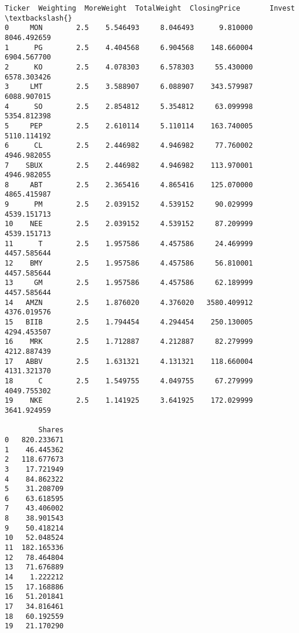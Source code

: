 \documentclass[11pt]{article}
\makeatletter
\newcommand{\boxspacing}{\kern\kvtcb@left@rule\kern\kvtcb@boxsep}
\newcommand{\prompt}[4]{
        {\ttfamily\llap{{\color{#2}[#3]:\hspace{3pt}#4}}\vspace{-\baselineskip}}
    }
\makeatother
\begin{document}
            \begin{tcolorbox}[breakable, size=fbox, boxrule=.5pt, pad at break*=1mm, opacityfill=0]
\prompt{Out}{outcolor}{50}{\boxspacing}
\begin{Verbatim}[commandchars=\\\{\}]
   Ticker  Weighting  MoreWeight  TotalWeight  ClosingPrice       Invest  \textbackslash{}
0     MON        2.5    5.546493     8.046493      9.810000  8046.492659
1      PG        2.5    4.404568     6.904568    148.660004  6904.567700
2      KO        2.5    4.078303     6.578303     55.430000  6578.303426
3     LMT        2.5    3.588907     6.088907    343.579987  6088.907015
4      SO        2.5    2.854812     5.354812     63.099998  5354.812398
5     PEP        2.5    2.610114     5.110114    163.740005  5110.114192
6      CL        2.5    2.446982     4.946982     77.760002  4946.982055
7    SBUX        2.5    2.446982     4.946982    113.970001  4946.982055
8     ABT        2.5    2.365416     4.865416    125.070000  4865.415987
9      PM        2.5    2.039152     4.539152     90.029999  4539.151713
10    NEE        2.5    2.039152     4.539152     87.209999  4539.151713
11      T        2.5    1.957586     4.457586     24.469999  4457.585644
12    BMY        2.5    1.957586     4.457586     56.810001  4457.585644
13     GM        2.5    1.957586     4.457586     62.189999  4457.585644
14   AMZN        2.5    1.876020     4.376020   3580.409912  4376.019576
15   BIIB        2.5    1.794454     4.294454    250.130005  4294.453507
16    MRK        2.5    1.712887     4.212887     82.279999  4212.887439
17   ABBV        2.5    1.631321     4.131321    118.660004  4131.321370
18      C        2.5    1.549755     4.049755     67.279999  4049.755302
19    NKE        2.5    1.141925     3.641925    172.029999  3641.924959

        Shares
0   820.233671
1    46.445362
2   118.677673
3    17.721949
4    84.862322
5    31.208709
6    63.618595
7    43.406002
8    38.901543
9    50.418214
10   52.048524
11  182.165336
12   78.464804
13   71.676889
14    1.222212
15   17.168886
16   51.201841
17   34.816461
18   60.192559
19   21.170290
\end{Verbatim}
\end{tcolorbox}
        
\end{document}
